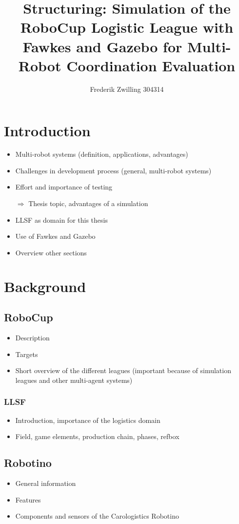 \documentclass[a4paper,11pt]{article}
\author{Frederik Zwilling 304314}
\title{Structuring: Simulation of the RoboCup Logistic League with Fawkes and Gazebo for Multi-Robot Coordination Evaluation}
\begin{document}
\maketitle
\tableofcontents
\newpage




\section{Introduction}
\begin{itemize}
\item Multi-robot systems (definition, applications, advantages)
\item Challenges in development process (general, multi-robot systems)
\item Effort and importance of testing
\item[$\Rightarrow$] Thesis topic, advantages of a simulation
\item LLSF as domain for this thesis
\item Use of Fawkes and Gazebo
\item Overview other sections
\end{itemize}

\section{Background}
\subsection{RoboCup}
\begin{itemize}
\item Description
\item Targets
\item Short overview of the different leagues (important because of simulation leagues and other multi-agent systems)
\end{itemize}
\subsubsection{LLSF}
\begin{itemize}
\item Introduction, importance of the logistics domain
\item Field, game elements, production chain, phases, refbox
\end{itemize}
\subsection{Robotino}
\begin{itemize}
\item General information
\item Features
\item Components and sensors of the Carologistics Robotino
\end{itemize}
\end{document}
